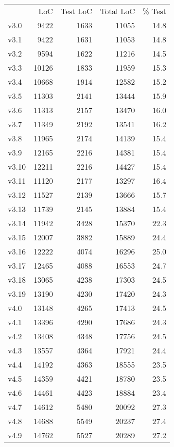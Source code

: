 \begin{table}[tbhp]
\renewcommand*{\arraystretch}{1.2}\centering\small
\begin{tabular}{lrrrr}\toprule
     & LoC & Test LoC & Total LoC & \% Test \\
v3.0 & 9422 & 1633 & 11055 & 14.8 \\
v3.1 & 9422 & 1631 & 11053 & 14.8 \\
v3.2 & 9594 & 1622 & 11216 & 14.5 \\
v3.3 & 10126 & 1833 & 11959 & 15.3 \\
v3.4 & 10668 & 1914 & 12582 & 15.2 \\
v3.5 & 11303 & 2141 & 13444 & 15.9 \\
v3.6 & 11313 & 2157 & 13470 & 16.0 \\
v3.7 & 11349 & 2192 & 13541 & 16.2 \\
v3.8 & 11965 & 2174 & 14139 & 15.4 \\
v3.9 & 12165 & 2216 & 14381 & 15.4 \\
v3.10 & 12211 & 2216 & 14427 & 15.4 \\
v3.11 & 11120 & 2177 & 13297 & 16.4 \\
v3.12 & 11527 & 2139 & 13666 & 15.7 \\
v3.13 & 11739 & 2145 & 13884 & 15.4 \\
v3.14 & 11942 & 3428 & 15370 & 22.3 \\
v3.15 & 12007 & 3882 & 15889 & 24.4 \\
v3.16 & 12222 & 4074 & 16296 & 25.0 \\
v3.17 & 12465 & 4088 & 16553 & 24.7 \\
v3.18 & 13065 & 4238 & 17303 & 24.5 \\
v3.19 & 13190 & 4230 & 17420 & 24.3 \\
v4.0 & 13148 & 4265 & 17413 & 24.5 \\
v4.1 & 13396 & 4290 & 17686 & 24.3 \\
v4.2 & 13408 & 4348 & 17756 & 24.5 \\
v4.3 & 13557 & 4364 & 17921 & 24.4 \\
v4.4 & 14192 & 4363 & 18555 & 23.5 \\
v4.5 & 14359 & 4421 & 18780 & 23.5 \\
v4.6 & 14461 & 4423 & 18884 & 23.4 \\
v4.7 & 14612 & 5480 & 20092 & 27.3 \\
v4.8 & 14688 & 5549 & 20237 & 27.4 \\
v4.9 & 14762 & 5527 & 20289 & 27.2 \\

\end{tabular}
\end{table}
